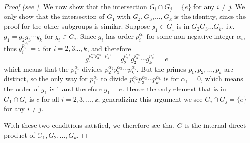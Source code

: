 \begin{proof}[Proof (see {\cite[Lemma 13.8]{judson_beezer_2022}})]
    We now show that the intersection $G_i \cap G_j = \{e\}$ for any $i \neq j$. We only show that the intersection of $G_1$ with $G_2, G_3, \dots, G_k$ is the identity, since the proof for the other subgroups is similar. Suppose $g_1 \in G_1$ is in $G_2G_3\dots G_k$, i.e. $g_1 = g_2g_3\cdots g_k$ for $g_i \in G_i$. Since $g_i$ has order $p_i^{\alpha_i}$ for some non-negative integer $\alpha_i$, thus $g_i^{p_i^{\alpha_i}} = e$ for $i = 2,3\dots,k$, and therefore
    \[
        g_1^{p_2^{\alpha_2}p_3^{\alpha_3}\cdots p_k^{\alpha_k}} = g_2^{p_2^{\alpha_2}}g_3^{p_3^{\alpha_3}}\cdots g_k^{p_k^{\alpha_k}} = e
    \]
    which means that the $p_1^{\alpha_1}$ divides $p_2^{\alpha_2}p_3^{\alpha_3}\cdots p_k^{\alpha_k}$. But the primes $p_1, p_2, \dots, p_k$ are distinct, so the only way for $p_1^{\alpha_1}$ to divide $p_2^{\alpha_2}p_3^{\alpha_3}\cdots p_k^{\alpha_k}$ is for $\alpha_1 = 0$, which means the order of $g_1$ is 1 and therefore $g_1 = e$. Hence the only element that is in $G_1 \cap G_i$ is $e$ for all $i = 2, 3, \dots, k$; generalizing this argument we see $G_i \cap G_j = \{e\}$ for any $i \neq j$.

    With these two conditions satisfied, we therefore see that $G$ is the internal direct product of $G_1, G_2, \dots, G_k$.
\end{proof}

